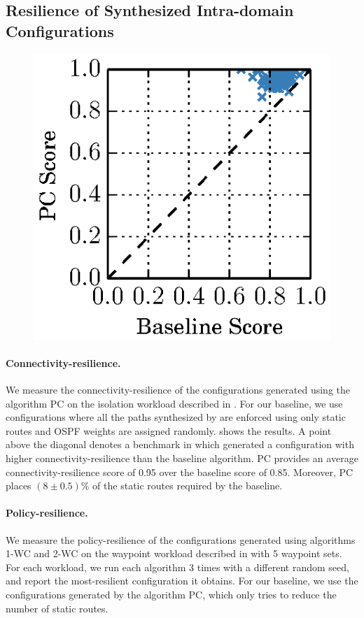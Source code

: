 \subsection{Resilience of Synthesized Intra-domain Configurations} \label{sec:reseval}

\begin{figure}
	\begin{center}
	\vspace{-10mm}
		\includegraphics[width=0.20\columnwidth]{figures/ospfbaselineresilience.eps}
	\end{center} 
\end{figure}
\paragraph{Connectivity-resilience.}
We measure the connectivity-resilience of the configurations 
generated using the algorithm PC on the isolation workload described in
. 
For our baseline, we use configurations 
where all the paths synthesized by \genesis
are enforced using only static routes and
OSPF weights are assigned randomly.
shows the results. A point above the diagonal 
denotes a benchmark in which \name
generated a configuration with higher connectivity-resilience than
the baseline algorithm.
PC provides an average connectivity-resilience score 
of 0.95 over the baseline score 
of 0.85.
Moreover, PC places
$(8 \pm 0.5)$\% of the static routes required by the baseline. 



\paragraph{Policy-resilience.}
We measure the policy-resilience of the configurations 
generated using algorithms  1-WC and 2-WC on the waypoint workload described in
 with 5 waypoint sets. 
For each workload, we run each algorithm 
3 times with a different random seed, and report the most-resilient configuration it obtains.
For our baseline, we use the configurations generated by the algorithm PC, which
only tries to reduce the number of static routes.

